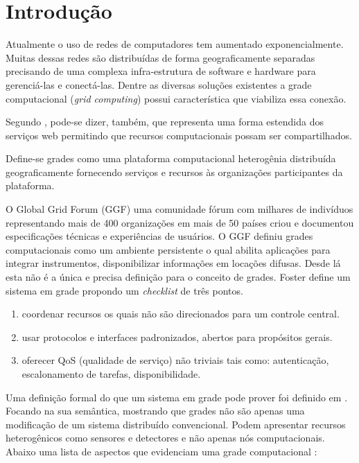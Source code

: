\section{Introdução}
\label{cap:introducao}

Atualmente o uso de redes de computadores tem aumentado exponencialmente. Muitas dessas redes são distribuídas de forma geograficamente separadas precisando de uma complexa infra-estrutura de software e hardware para gerenciá-las e conectá-las. Dentre as diversas soluções existentes a grade computacional (\emph{grid computing}) possui característica que viabiliza essa conexão.

Segundo \cite[apud \cite{Kesselman2001}]{Mangan2006}, pode-se dizer, também, que representa uma forma estendida dos serviços web permitindo que recursos computacionais possam ser compartilhados.

Define-se grades como uma plataforma computacional heterogênia distribuída geograficamente fornecendo serviços e recursos às organizações participantes da plataforma.

\cite[apud]{Mangan2006} O Global Grid Forum (GGF) uma comunidade fórum com milhares de indivíduos representando mais de 400 organizações em mais de 50 países criou e documentou especificações técnicas e experiências de usuários. O GGF definiu grades computacionais como um ambiente persistente o qual abilita aplicações para integrar instrumentos, disponibilizar informações em locações difusas. Desde lá esta não é a única e precisa definição para o conceito de grades. Foster \cite{Kesselman2001} define um sistema em grade propondo um \emph{checklist} de três pontos.

\begin{enumerate}
	\item coordenar recursos os quais não são direcionados para um controle central.
	\item usar protocolos e interfaces padronizados, abertos para propósitos gerais.
	\item oferecer QoS (qualidade de serviço) não triviais tais como: autenticação, escalonamento de tarefas, disponibilidade.
\end{enumerate}

Uma definição formal do que um sistema em grade pode prover foi definido em \cite[apud]{Mangan2006}. Focando na sua semântica, mostrando que grades não são apenas uma modificação de um sistema distribuído convencional. Podem apresentar recursos heterogênicos como sensores e detectores e não apenas nós computacionais. Abaixo uma lista de aspectos que evidenciam uma grade computacional \cite{Cirne2002}:


